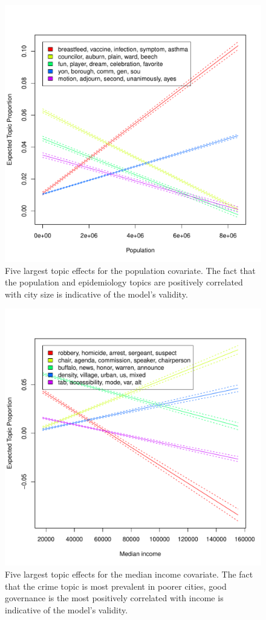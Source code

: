 \documentclass[11pt]{article}
\begin{document}
\begin{figure}[htp]
	\centering
	\caption{Five largest topic effects for the population covariate. The fact that the population and epidemiology topics are positively correlated with city size is indicative of the model's validity.}
	\label{stmEffectPop}
	\includegraphics[width=\linewidth]{figures/stm_effect_pop.pdf}
\end{figure}

\begin{figure}[htp]
	\centering
	\caption{Five largest topic effects for the median income covariate. The fact that the crime topic is most prevalent in poorer cities, good governance is the most positively correlated with income is indicative of the model's validity.}
	\label{stmEffectIncome}
	\includegraphics[width=\linewidth]{figures/stm_effect_income.pdf}
\end{figure}


\end{document}

